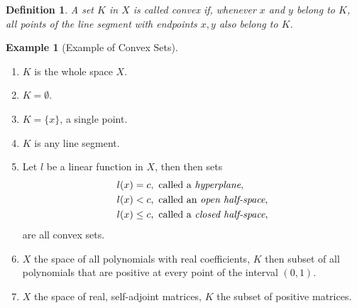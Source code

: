 \documentclass[11pt]{book}
\newtheorem{definition}{Definition}[chapter]
\theoremstyle{definition}
\newtheorem{example}{Example}[chapter]
\numberwithin{equation}{chapter}
\begin{document}
\medskip

\begin{definition}
A set $K$ in $X$ is called convex if, whenever $x$ and $y$ belong to $K$, all points of the line segment with endpoints $x, y$ also belong to $K$.
\end{definition}

\medskip

\begin{example}[Example of Convex Sets]
~\begin{enumerate}[label=(\arabic*)]
    \item $K$ is the whole space $X$.
    
    \item $K = \emptyset$.
    
    \item $K = \{x\}$, a single point.
    
    \item $K$ is any line segment.
    
    \item Let $l$ be a linear function in $X$, then then sets 
    \begin{align*}
        l(x) & = c, \,\,\text{called a {\em hyperplane}}, \\
        l(x) & < c, \,\,\text{called an {\em open half-space}}, \\
        l(x) & \leq c, \,\,\text{called a {\em closed half-space}},
    \end{align*}
    are all convex sets.
    
    \item $X$ the space of all polynomials with real coefficients, $K$ then subset of all polynomials that are positive at every point of the interval $(0,1)$.
    
    \item $X$ the space of real, self-adjoint matrices, $K$ the subset of positive matrices.
\end{enumerate}
\end{example}

\medskip
\end{document}
